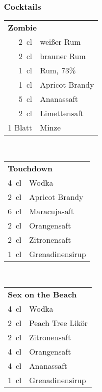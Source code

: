 \subsubsection{Cocktails}
\begin{table}[h!]
  \begin{subtable}[t]{0.3\textwidth}
    \centering
    \vspace{0pt}
    \begin{tabular}{|rl|} \hline
      \multicolumn{2}{|l|}{\textbf{Zombie}} \\
      \SI{2}{\centi\litre} & weißer Rum \\
      \SI{2}{\centi\litre} & brauner Rum \\
      \SI{1}{\centi\litre} & Rum, 73\% \\
      \SI{1}{\centi\litre} & Apricot Brandy \\
      \SI{5}{\centi\litre} & Ananassaft \\
      \SI{2}{\centi\litre} & Limettensaft \\
      1 Blatt & Minze \\ \hline
    \end{tabular}
  \end{subtable}
  ~
  \begin{subtable}[t]{0.3\textwidth}
    \centering
    \vspace{0pt}
    \begin{tabular}{|rl|} \hline
      \multicolumn{2}{|l|}{\textbf{Touchdown}} \\
      \SI{4}{\centi\litre} & Wodka \\
      \SI{2}{\centi\litre} & Apricot Brandy \\
      \SI{6}{\centi\litre} & Maracujasaft \\
      \SI{2}{\centi\litre} & Orangensaft \\
      \SI{2}{\centi\litre} & Zitronensaft \\
      \SI{1}{\centi\litre} & Grenadinensirup \\ \hline
    \end{tabular}
  \end{subtable}
  ~
  \begin{subtable}[t]{0.3\textwidth}
    \centering
    \vspace{0pt}
    \begin{tabular}{|rl|} \hline
      \multicolumn{2}{|l|}{\textbf{Sex on the Beach}} \\
      \SI{4}{\centi\litre} & Wodka \\
      \SI{2}{\centi\litre} & Peach Tree Likör \\
      \SI{2}{\centi\litre} & Zitronensaft \\
      \SI{4}{\centi\litre} & Orangensaft \\
      \SI{4}{\centi\litre} & Ananassaft \\
      \SI{1}{\centi\litre} & Grenadinensirup \\ \hline
    \end{tabular}
  \end{subtable}


\end{table}
